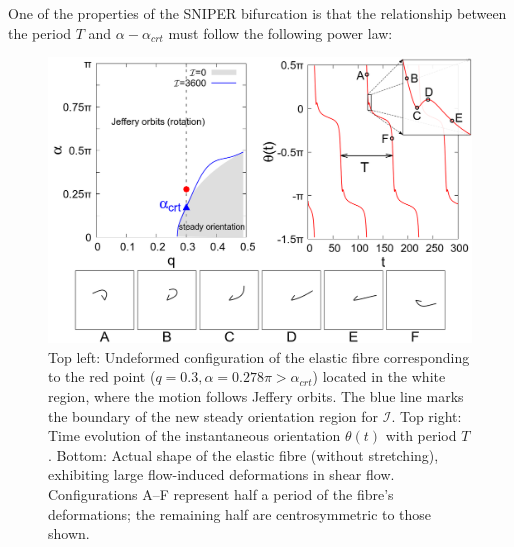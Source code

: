\documentclass[lineno]{JFM-FLM_Au}
\begin{document}
One of the properties of the SNIPER bifurcation is that the relationship between the period $T$ and $\alpha-\alpha_{crt}$ must follow the following power law:

\begin{figure}[!h]
	\begin{center}
		\includegraphics[width=1\textwidth]{plot/rotating_and_non_rotating/rotating.png}
		\caption{Top left: Undeformed configuration of the elastic fibre corresponding to the red point ($q=0.3, \alpha=0.278\pi>\alpha_{crt}$) located in the white region, where the motion follows Jeffery orbits. The blue line marks the boundary of the new steady orientation region for $\mathcal{I}$. Top right: Time evolution of the instantaneous orientation $\theta(t)$ with period $T$. Bottom: Actual shape of the elastic fibre (without stretching), exhibiting large flow-induced deformations in shear flow. Configurations A–F represent half a period of the fibre’s deformations; the remaining half are centrosymmetric to those shown.}
		\label{fig:24}
	\end{center}
\end{figure}
\end{document}
